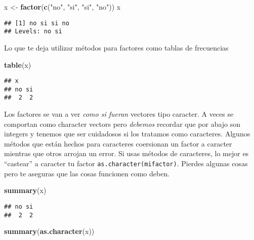 \documentclass[]{article}
\newenvironment{Shaded}{\begin{snugshade}}{\end{snugshade}}
\newcommand{\KeywordTok}[1]{\textcolor[rgb]{0.13,0.29,0.53}{\textbf{{#1}}}}
\newcommand{\StringTok}[1]{\textcolor[rgb]{0.31,0.60,0.02}{{#1}}}
\newcommand{\NormalTok}[1]{{#1}}
\begin{document}
\begin{Shaded}
\begin{Highlighting}[]
\NormalTok{x <-}\StringTok{ }\KeywordTok{factor}\NormalTok{(}\KeywordTok{c}\NormalTok{(}\StringTok{"no"}\NormalTok{, }\StringTok{"si"}\NormalTok{, }\StringTok{"si"}\NormalTok{, }\StringTok{"no"}\NormalTok{))}
\NormalTok{x}
\end{Highlighting}
\end{Shaded}

\begin{verbatim}
## [1] no si si no
## Levels: no si
\end{verbatim}

Lo que te deja utilizar métodos para factores como tablas de frecuencias

\begin{Shaded}
\begin{Highlighting}[]
\KeywordTok{table}\NormalTok{(x)}
\end{Highlighting}
\end{Shaded}

\begin{verbatim}
## x
## no si 
##  2  2
\end{verbatim}

Los factores se van a ver \emph{como si fueran} vectores tipo caracter.
A veces se comportan como character vectors pero \emph{debemos} recordar
que por abajo son integers y tenemos que ser cuidadosos si los tratamos
como caracteres. Algunos métodos que están hechos para caracteres
coersionan un factor a caracter mientras que otros arrojan un error. Si
usas métodos de caracteres, lo mejor es ``castear'' a caracter tu factor
\texttt{as.character(mifactor)}. Pierdes algunas cosas pero te aseguras
que las cosas funcionen como deben.

\begin{Shaded}
\begin{Highlighting}[]
\KeywordTok{summary}\NormalTok{(x)}
\end{Highlighting}
\end{Shaded}

\begin{verbatim}
## no si 
##  2  2
\end{verbatim}

\begin{Shaded}
\begin{Highlighting}[]
\KeywordTok{summary}\NormalTok{(}\KeywordTok{as.character}\NormalTok{(x))}
\end{Highlighting}
\end{Shaded}
\end{document}
